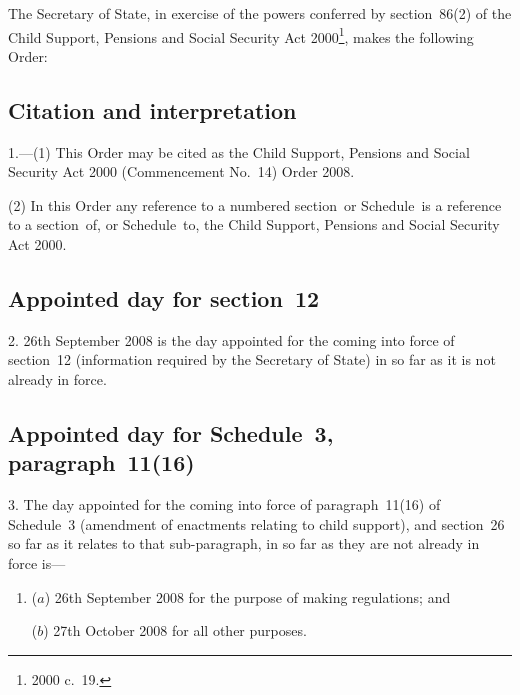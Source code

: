 \documentclass[12pt,a4paper]{article}
\title{\regstitle}
\author{S.I.\ 2008 No.\ 2545 (C.~109)}
\date{Made
25th September 2008
}
\begin{document}
\maketitle

\noindent
The Secretary of State, in exercise of the powers conferred by section~86(2) of the Child Support, Pensions and Social Security Act 2000\footnote{2000 c.~19.}, makes the following Order: 

{\sloppy

\tableofcontents

}

\bigskip

\setcounter{secnumdepth}{-2}

\subsection[1. Citation and interpretation]{Citation and interpretation}

1.---(1)  This Order may be cited as the Child Support, Pensions and Social Security Act 2000 (Commencement No.~14) Order 2008.

(2) In this Order any reference to a numbered section~or Schedule~is a reference to a section~of, or Schedule~to, the Child Support, Pensions and Social Security Act 2000.

\subsection[2. Appointed day for section~12]{Appointed day for section~12}

2.  26th September 2008 is the day appointed for the coming into force of section~12 (information required by the Secretary of State) in so far as it is not already in force.

\subsection[3. Appointed day for Schedule~3, paragraph~11(16)]{Appointed day for Schedule~3, paragraph~11(16)}

3.  The day appointed for the coming into force of paragraph~11(16) of Schedule~3 (amendment of enactments relating to child support), and section~26 so far as it relates to that sub-paragraph, in so far as they are not already in force is—
\begin{enumerate}\item[]
($a$) 26th September 2008 for the purpose of making regulations; and

($b$) 27th October 2008 for all other purposes.
\end{enumerate}
\end{document}
